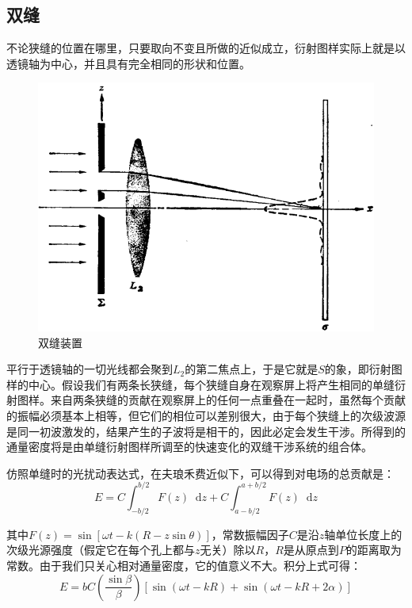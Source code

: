 \documentclass[UTF8]{ctexart}
\newcommand*{\dif}{\mathop{}\!\mathrm{d}}
\begin{document}
	\subsection{双缝}
	不论狭缝的位置在哪里，只要取向不变且所做的近似成立，衍射图样实际上就是以透镜轴为中心，并且具有完全相同的形状和位置。
	\newpage
	\begin{figure}[ht]
		\centering
		\includegraphics[width=12cm]{Diffraction_double_feng.png}
		\caption{双缝装置}
		\label{figure_double_feng}
	\end{figure}

\noindent 平行于透镜轴的一切光线都会聚到$ L_{2} $的第二焦点上，于是它就是$ S $的象，即衍射图样的中心。假设我们有两条长狭缝，每个狭缝自身在观察屏上将产生相同的单缝衍射图样。来自两条狭缝的贡献在观察屏上的任何一点重叠在一起时，虽然每个贡献的振幅必须基本上相等，但它们的相位可以差别很大，由于每个狭缝上的次级波源是同一初波激发的，结果产生的子波将是相干的，因此必定会发生干涉。所得到的通量密度将是由单缝衍射图样所调至的快速变化的双缝干涉系统的组合体。

	仿照单缝时的光扰动表达式，在夫琅禾费近似下，可以得到对电场的总贡献是：
	\begin{equation}
	E=C \int_{-b / 2}^{b / 2} F(z) \dif z+C \int_{a-b / 2}^{a+b / 2} F(z) \dif z
	\end{equation}
	
\noindent 其中$F(z)=\sin [\omega t-k(R-z \sin \theta)]$，常数振幅因子$ C $是沿$ z $轴单位长度上的次级光源强度（假定它在每个孔上都与$ z $无关）除以$ R $，$ R $是从原点到$ P $的距离取为常数。由于我们只关心相对通量密度，它的值意义不大。积分上式可得：
\begin{equation}
E=b C\left(\frac{\sin \beta}{\beta}\right)[\sin (\omega t-k R)+\sin (\omega t-k R+2 \alpha)]
\end{equation}
\end{document}
